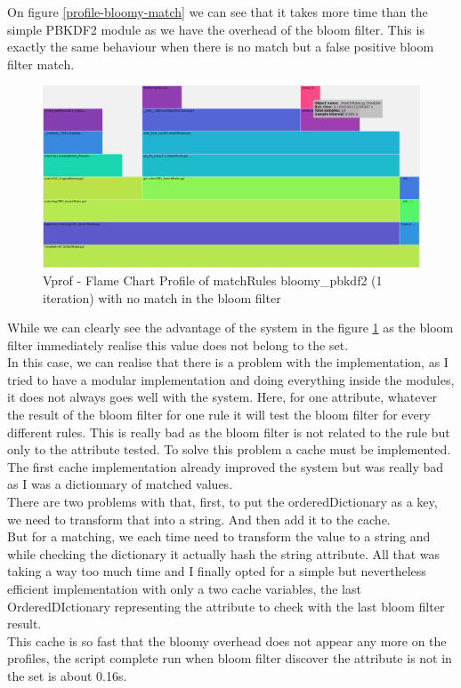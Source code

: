 \documentclass{eplmastersthesis}
\begin{document}
On figure \ref{profile-bloomy-match} we can see that it takes more time than the simple PBKDF2 module as we have the overhead of the bloom filter. This is exactly the same behaviour when there is no match but a false positive bloom filter match.\\

\begin{figure}[h!]
\begin{center}
	\includegraphics[scale=0.3]{res/match-bloom-not}
	\caption{Vprof - Flame Chart Profile of matchRules bloomy\_pbkdf2 (1 iteration) with no match in the bloom filter}
	\label{profile-bloomy-no-match}
\end{center}
\end{figure}

While we can clearly see the advantage of the system in the figure \ref{profile-bloomy-no-match} as the bloom filter immediately realise this value does not belong to the set.\\

In this case, we can realise that there is a problem with the implementation, as I tried to have a modular implementation and doing everything inside the modules, it does not always goes well with the system. Here, for one attribute, whatever the result of the bloom filter for one rule it will test the bloom filter for every different rules. This is really bad as the bloom filter is not related to the rule but only to the attribute tested. To solve this problem a cache must be implemented. The first cache implementation already improved the system but was really bad as I was a dictionnary of matched values.\\
There are two problems with that, first, to put the orderedDictionary as a key, we need to transform that into a string. And then add it to the cache.\\
But for a matching, we each time need to transform the value to a string and while checking the dictionary it actually hash the string attribute. All that was taking a way too much time and I finally opted for a simple but nevertheless efficient implementation with only a two cache variables, the last OrderedDIctionary representing the attribute to check with the last bloom filter result.\\
This cache is so fast that the bloomy overhead does not appear any more on the profiles, the script complete run when bloom filter discover the attribute is not in the set is about 0.16s.\\
\end{document}
